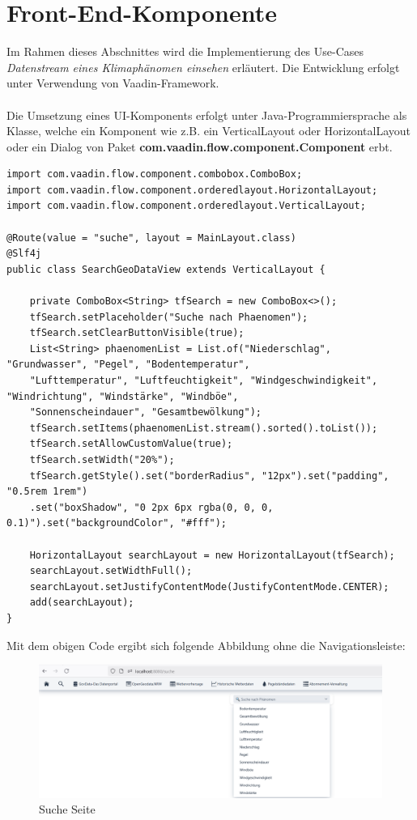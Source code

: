 \documentclass[a4paper,12pt]{scrreprt}
\begin{document}
\section{Front-End-Komponente }
Im Rahmen dieses Abschnittes wird die Implementierung des Use-Cases \textit{Datenstream eines Klimaphänomen einsehen} erläutert. Die Entwicklung erfolgt unter Verwendung von Vaadin-Framework.\\ \\
Die Umsetzung eines UI-Komponents erfolgt unter Java-Programmiersprache als Klasse, welche ein Komponent wie z.B. ein VerticalLayout oder HorizontalLayout oder ein Dialog von Paket \textbf{com.vaadin.flow.component.Component} erbt.
\begin{lstlisting}
import com.vaadin.flow.component.combobox.ComboBox;
import com.vaadin.flow.component.orderedlayout.HorizontalLayout;
import com.vaadin.flow.component.orderedlayout.VerticalLayout;
		
@Route(value = "suche", layout = MainLayout.class)
@Slf4j
public class SearchGeoDataView extends VerticalLayout {
			
	private ComboBox<String> tfSearch = new ComboBox<>();
	tfSearch.setPlaceholder("Suche nach Phaenomen");
	tfSearch.setClearButtonVisible(true);
	List<String> phaenomenList = List.of("Niederschlag", "Grundwasser", "Pegel", "Bodentemperatur",
	"Lufttemperatur", "Luftfeuchtigkeit", "Windgeschwindigkeit", "Windrichtung", "Windstärke", "Windböe",
	"Sonnenscheindauer", "Gesamtbewölkung");
	tfSearch.setItems(phaenomenList.stream().sorted().toList());
	tfSearch.setAllowCustomValue(true);
	tfSearch.setWidth("20%");
	tfSearch.getStyle().set("borderRadius", "12px").set("padding", "0.5rem 1rem")
	.set("boxShadow", "0 2px 6px rgba(0, 0, 0, 0.1)").set("backgroundColor", "#fff");
		
	HorizontalLayout searchLayout = new HorizontalLayout(tfSearch);
	searchLayout.setWidthFull();
	searchLayout.setJustifyContentMode(JustifyContentMode.CENTER);
	add(searchLayout);
}
\end{lstlisting}
Mit dem obigen Code ergibt sich folgende Abbildung ohne die Navigationsleiste: 
\begin{figure}[h!]
	\centering
	\includegraphics[width=17cm]{suchSeite.png}
	\caption{\label{suche:Seite}Suche Seite}
\end{figure}
	
\end{document}
